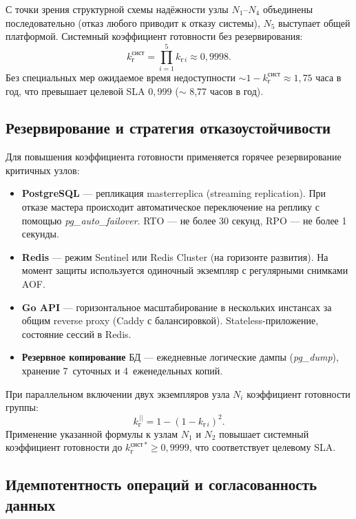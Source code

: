 С точки зрения структурной схемы надёжности узлы $N_1$--$N_4$
объединены последовательно (отказ любого приводит к отказу системы),
$N_5$ выступает общей платформой. Системный коэффициент готовности
без резервирования:
\[
    k_{\text{г}}^{\text{сист}} = \prod_{i=1}^{5} k_{\text{г}\, i} \approx 0{,}9998.
\]
Без специальных мер ожидаемое время недоступности
${\sim} 1 - k_{\text{г}}^{\text{сист}} \approx 1{,}75$ часа в год,
что превышает целевой SLA $0{,}999$ ($\sim$ 8{,}77 часов в год).

\subsection{Резервирование и стратегия отказоустойчивости}

Для повышения коэффициента готовности применяется горячее
резервирование критичных узлов:
\begin{itemize}[noitemsep]
    \item \textbf{PostgreSQL} --- репликация master\textendash replica
          (streaming replication). При отказе мастера происходит
          автоматическое переключение на реплику с помощью
          \textit{pg\_auto\_failover}. RTO --- не более 30 секунд,
          RPO --- не более 1 секунды.
    \item \textbf{Redis} --- режим Sentinel или Redis Cluster
          (на горизонте развития). На момент защиты используется
          одиночный экземпляр с регулярными снимками AOF.
    \item \textbf{Go API} --- горизонтальное масштабирование
          в нескольких инстансах за общим reverse proxy
          (Caddy с балансировкой). Stateless-приложение,
          состояние сессий в Redis.
    \item \textbf{Резервное копирование} БД --- ежедневные
          логические дампы (\textit{pg\_dump}), хранение
          7~суточных и 4~еженедельных копий.
\end{itemize}

При параллельном включении двух экземпляров узла $N_i$
коэффициент готовности группы:
\[
    k_{\text{г}}^{\,||} = 1 - (1 - k_{\text{г}\, i})^2.
\]
Применение указанной формулы к узлам $N_1$ и $N_2$ повышает
системный коэффициент готовности до $k_{\text{г}}^{\text{сист}\,*}
\geq 0{,}9999$, что соответствует целевому SLA.

\subsection{Идемпотентность операций и согласованность данных}

